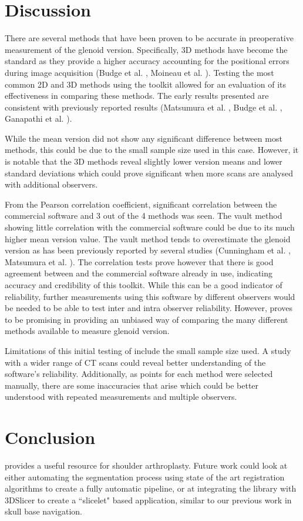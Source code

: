 \section{Discussion}
\label{sec:discussion}
There are several methods that have been proven to be accurate in preoperative measurement of 
the glenoid version. Specifically, 3D methods have become the standard as they
provide a higher accuracy accounting for the positional errors during image acquisition
(Budge et al. \cite{BUDGE2011577}, Moineau et al. \cite{PMID:22964089}). 
Testing the most common 2D and 3D methods using the 
\sksglenoid toolkit allowed for an evaluation of its effectiveness in comparing these methods. 
The early results presented are consistent with 
previously reported results (Matsumura et al. \cite{PMID:24618285}, 
Budge et al. \cite{BUDGE2011577}, Ganapathi et al. \cite{PMID:20933439}).

While the mean version did not show any significant difference between most methods, 
this could be due to the small sample size used in this case. However, it is notable
that the 3D methods reveal slightly lower version means and lower standard deviations
which could prove significant when more scans are analysed with additional observers.

From the Pearson correlation coefficient, significant correlation between the commercial 
software and 3 out of the 4 methods was seen. The vault method showing little correlation
with the commercial software could be due to its much higher mean version value.
The vault method tends to overestimate the glenoid version as has been previously
reported by several studies (Cunningham et al. \cite{PMID:29778592},
Matsumura et al. \cite{PMID:24618285}). 
The correlation
tests prove however that there is good agreement between \sksglenoid and the
commercial software already in use, indicating accuracy and credibility of this toolkit.
While this can be a good indicator of reliability, further measurements using this software
by different observers would be needed to be able to test inter and intra observer reliability.
However, \sksglenoid proves to be promising in providing an unbiased way of
comparing the many different methods available to measure glenoid version.

Limitations of this initial testing of \sksglenoid include the small sample size used.
A study 
with a wider range of CT scans could reveal better understanding of the software’s reliability. 
Additionally, as points for each method were selected manually, there are some inaccuracies that 
arise which could be better understood with repeated measurements and multiple observers.

\section{Conclusion}
\sksglenoid provides a useful resource for shoulder arthroplasty. Future work could look at either 
automating the segmentation process using state of the art registration algorithms \cite{Fu2020} to create a fully automatic pipeline, or at integrating the library with 3DSlicer to create a 
``slicelet" based application, similar to our previous work \cite{PMID:33937966} in skull base 
navigation.

